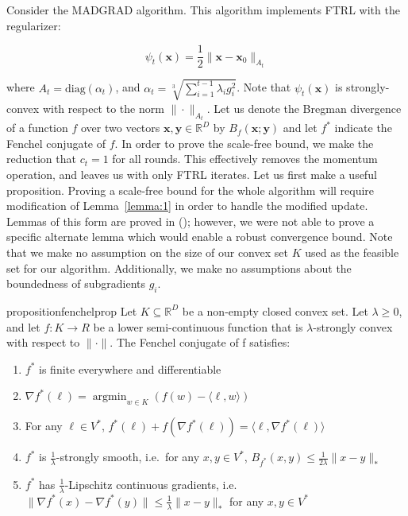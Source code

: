\documentclass{article}
\newcommand{\R}{\mathbb{R}}
\newcommand{\argmin}{\mathop{\text{argmin}}}
\newcommand{\diag}{\text{diag}}
\newcommand{\bx}{\mathbf{x}}
\newcommand{\by}{\mathbf{y}}
\begin{document}
Consider the MADGRAD algorithm. This algorithm implements FTRL with the regularizer: 

\[
  \psi_t(\bx) = \frac{1}{2} \|\bx - \bx_0 \|_{A_t}
\]

where $A_t = \diag(\alpha_t)$, and $\alpha_t = \sqrt[3]{\sum_{i=1}^{t-1}\lambda_i g_i^2}$. Note that $\psi_t(\bx)$ is
strongly-convex with respect to the norm $\| \cdot \|_{A_t}$. Let us denote the Bregman divergence of a function $f$
over two vectors $\bx, \by \in \R^D$ by $B_f(\bx; \by)$ and let $f^*$ indicate the Fenchel conjugate of $f$. In
order to prove the scale-free bound, we make the reduction that $c_t = 1$ for all rounds. This effectively removes the
momentum operation, and leaves us with only FTRL iterates. Let us first make a useful proposition. Proving a scale-free
bound for the whole algorithm will require modification of Lemma~\ref{lemma:1} in order to handle the modified update.
Lemmas of this form are proved in (\cite{nesterov_quasi-monotone_2015}); however, we were not able to prove a specific
alternate lemma which would enable a robust convergence bound.  Note that we make no assumption on the size of our
convex set $K$ used as the feasible set for our algorithm.  Additionally, we make no assumptions about the boundedness
of subgradients $g_i$. 

\begin{restatable}{proposition}{fenchelprop}\label{prop:1}
  Let $K \subseteq \R^D$ be a non-empty closed convex set. Let $\lambda \geq 0$, and let $f: K \rightarrow R$ be a lower
  semi-continuous function that is $\lambda$-strongly convex with respect to $\| \cdot \|$. The Fenchel conjugate of f
  satisfies:

  \begin{enumerate}
    \item $f^*$ is finite everywhere and differentiable
    \item $\nabla f^* (\ell) = \argmin_{w \in K}(f(w) - \langle \ell, w \rangle)$
    \item For any $\ell \in V^*$, $f^*(\ell) + f(\nabla f^*(\ell)) = \langle \ell, \nabla f^* (\ell) \rangle$
    \item $f^*$ is $\frac{1}{\lambda}$-strongly smooth, i.e.\ for any $x, y \in V^*$, $B_{f^*}(x, y) \leq
      \frac{1}{2\lambda}\|x - y \|_*$
    \item $f^*$ has $\frac{1}{\lambda}$-Lipschitz continuous gradients, i.e. $\| \nabla f^*(x) - \nabla f^*(y)\| \leq
      \frac{1}{\lambda}\|x - y\|_*$ for any $x, y \in V^*$
  \end{enumerate}
\end{restatable}
\end{document}

